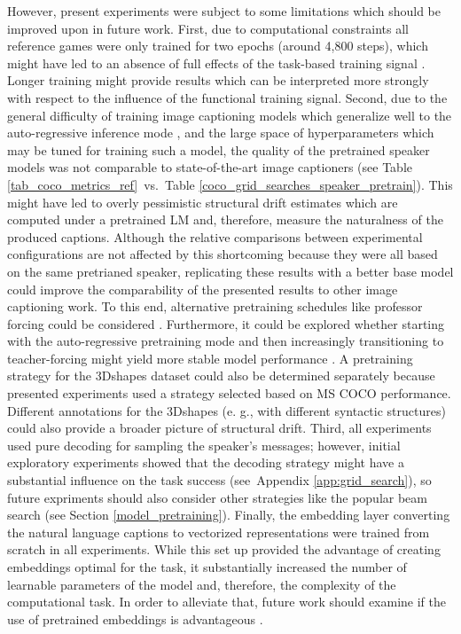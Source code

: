 However, present experiments were subject to some limitations which should be improved upon in future work. First, due to computational constraints all reference games were only trained for two epochs (around 4,800 steps), which might have led to an absence of full effects of the task-based training signal \parencite[compared to, e.g.,][who had 300,000 training steps]{lee2019countering}. Longer training might provide results which can be interpreted more strongly with respect to the influence of the functional training signal. Second, due to the general difficulty of training image captioning models which generalize well to the auto-regressive inference mode \parencite{lamb2016professor}, and the large space of hyperparameters which may be tuned for training such a model, the quality of the pretrained speaker models was not comparable to state-of-the-art image captioners (see Table \ref{tab_coco_metrics_ref}~vs.~Table \ref{coco_grid_searches_speaker_pretrain}). This might have led to overly pessimistic structural drift estimates which are computed under a pretrained LM and, therefore, measure the naturalness of the produced captions. Although the relative comparisons between experimental configurations are not affected by this shortcoming because they were all based on the same pretrianed speaker, replicating these results with a better base model could improve the comparability of the presented results to other image captioning work. To this end, alternative pretraining schedules like professor forcing could be considered \parencite{lamb2016professor}. Furthermore, it could be explored whether starting with the auto-regressive pretraining mode and then increasingly transitioning to teacher-forcing might yield more stable model performance \parencite[although similar explorations by][suggest that this order might not work very well]{lowe2020interaction}. A pretraining strategy for the 3Dshapes dataset could also be determined separately because presented experiments used a strategy selected based on MS COCO performance. Different annotations for the 3Dshapes (e. g., with different syntactic structures) could also provide a broader picture of structural drift.
Third, all experiments used pure decoding for sampling the speaker's messages; however, initial exploratory experiments showed that the decoding strategy might have a substantial influence on the task success (see~Appendix \ref{app:grid_search}), so future expriments should also consider other strategies like the popular beam search (see Section \ref{model_pretraining}).  
Finally, the embedding layer converting the natural language captions to vectorized representations were trained from scratch in all experiments. While this set up provided the advantage of creating embeddings optimal for the task, it substantially increased the number of learnable parameters of the model and, therefore, the complexity of the computational task. In order to alleviate that, future work should examine if the use of pretrained embeddings is advantageous \parencite[following, e.~g.,][]{atliha2021pretrained}.

